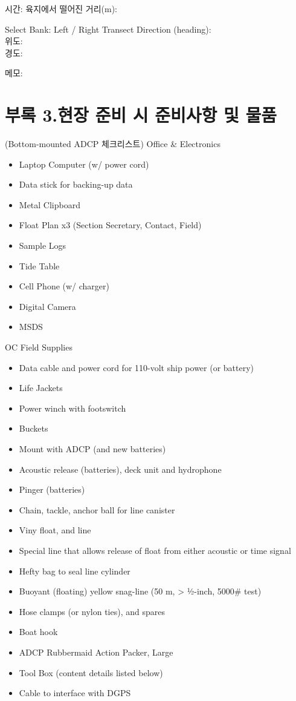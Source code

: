 \documentclass[
]{book}
\providecommand{\tightlist}{%
  \setlength{\itemsep}{0pt}\setlength{\parskip}{0pt}}
\begin{document}
시간: 육지에서 떨어진 거리(m):

Select Bank: Left / Right
Transect Direction (heading):\\
위도:\\
경도:

메모:

\hypertarget{uxbd80uxb85d-3.uxd604uxc7a5-uxc900uxbe44-uxc2dc-uxc900uxbe44uxc0acuxd56d-uxbc0f-uxbb3cuxd488}{%
\section{부록 3.현장 준비 시 준비사항 및 물품}\label{uxbd80uxb85d-3.uxd604uxc7a5-uxc900uxbe44-uxc2dc-uxc900uxbe44uxc0acuxd56d-uxbc0f-uxbb3cuxd488}}

(Bottom-mounted ADCP 체크리스트)
Office \& Electronics

\begin{itemize}
\tightlist
\item
  Laptop Computer (w/ power cord)
\item
  Data stick for backing-up data
\item
  Metal Clipboard
\item
  Float Plan x3 (Section Secretary, Contact, Field)
\item
  Sample Logs
\item
  Tide Table
\item
  Cell Phone (w/ charger)
\item
  Digital Camera
\item
  MSDS
\end{itemize}

OC Field Supplies

\begin{itemize}
\tightlist
\item
  Data cable and power cord for 110-volt ship power (or battery)
\item
  Life Jackets
\item
  Power winch with footswitch
\item
  Buckets
\item
  Mount with ADCP (and new batteries)
\item
  Acoustic release (batteries), deck unit and hydrophone
\item
  Pinger (batteries)
\item
  Chain, tackle, anchor ball for line canister
\item
  Viny float, and line
\item
  Special line that allows release of float from either acoustic or time signal
\item
  Hefty bag to seal line cylinder
\item
  Buoyant (floating) yellow snag-line (50 m, \textgreater{} ½-inch, 5000\# test)
\item
  Hose clamps (or nylon ties), and spares
\item
  Boat hook
\item
  ADCP Rubbermaid Action Packer, Large
\item
  Tool Box (content details listed below)
\item
  Cable to interface with DGPS
\end{itemize}
\end{document}
